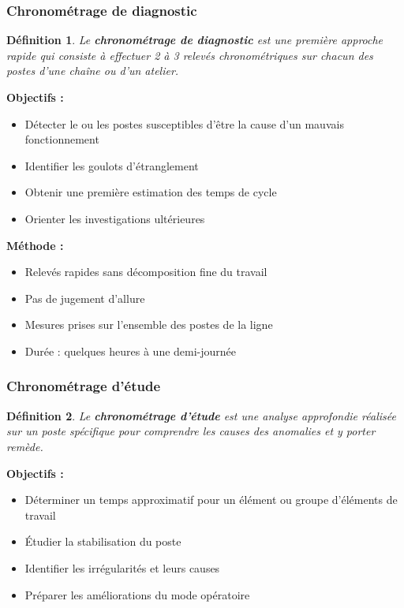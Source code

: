 \documentclass[a4paper,12pt]{article}
\newtheorem{definition}{Définition}[section]
\begin{document}
\subsubsection{Chronométrage de diagnostic}

\begin{definition}
Le \textbf{chronométrage de diagnostic} est une première approche rapide qui consiste à effectuer 2 à 3 relevés chronométriques sur chacun des postes d'une chaîne ou d'un atelier.
\end{definition}

\textbf{Objectifs :}
\begin{itemize}
    \item Détecter le ou les postes susceptibles d'être la cause d'un mauvais fonctionnement
    \item Identifier les goulots d'étranglement
    \item Obtenir une première estimation des temps de cycle
    \item Orienter les investigations ultérieures
\end{itemize}

\textbf{Méthode :}
\begin{itemize}
    \item Relevés rapides sans décomposition fine du travail
    \item Pas de jugement d'allure
    \item Mesures prises sur l'ensemble des postes de la ligne
    \item Durée : quelques heures à une demi-journée
\end{itemize}

\subsubsection{Chronométrage d'étude}

\begin{definition}
Le \textbf{chronométrage d'étude} est une analyse approfondie réalisée sur un poste spécifique pour comprendre les causes des anomalies et y porter remède.
\end{definition}

\textbf{Objectifs :}
\begin{itemize}
    \item Déterminer un temps approximatif pour un élément ou groupe d'éléments de travail
    \item Étudier la stabilisation du poste
    \item Identifier les irrégularités et leurs causes
    \item Préparer les améliorations du mode opératoire
\end{itemize}
\end{document}
